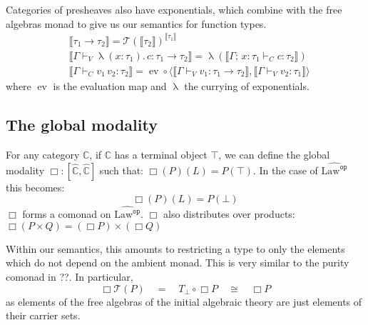 \documentclass[acmsmall, screen, nonacm]{acmart}
\theoremstyle{definition}
\newcommand{\glob}{\mathop{\Box}}
\newcommand{\cat}{\mathbb{C}}
\newcommand{\psh}{\widehat{\cat}}
\newcommand{\terminal}{\top}
\newcommand{\initial}{\bot}
\newcommand{\lawc}{\mathrm{Law}}
\newcommand{\lawcop}{\lawc^{\mathtt{op}}}
\newcommand{\pshlawcop}{\widehat{\lawcop}}
\newcommand{\arrow}[2]{{#2}^{#1}}
\newcommand{\sem}[1]{\llbracket #1 \rrbracket}
\newcommand{\mon}{\mathcal{T}}
\newcommand{\abs}[3]{\mathop{\lambda}(#1 \types #2).\,#3}
\newcommand{\app}[2]{#1\,#2}
\newcommand{\types}{\mathrel{:}}
\newcommand{\ccons}[2]{#1;\,#2}
\newcommand{\lbind}[3]{\ccons{#1}{#2\types#3}}
\newcommand{\turnv}{\mathrel{\vdash_V}}
\newcommand{\turnc}{\mathrel{\vdash_C}}
\newcommand{\evmap}{\mathop{ev}}
\newcommand{\currymap}{\mathop{\lambda}}
\begin{document}
Categories of presheaves also have exponentials, which combine with the
free algebras monad to give us our semantics for function types.
\begin{align*}
  &\sem{\tau_1 \rightarrow \tau_2} = \arrow{\sem{\tau_1}}{\mon(\sem{\tau_2})} \\
  &\sem{\Gamma \turnv \abs{x}{\tau_1}{c} \types \tau_1 \rightarrow \tau_2} =
    \currymap(\sem{\lbind{\Gamma}{x}{\tau_1} \turnc c \types \tau_2})
     \\
  &\sem{\Gamma \turnc \app{v_1}{v_2} \types \tau_2} =
    \evmap
    \circ \langle \sem{\Gamma \turnv v_1 \types \tau_1 \rightarrow \tau_2},
                  \sem{\Gamma \turnv v_2 \types \tau_1} \rangle
\end{align*}
where $\evmap$ is the evaluation map and $\currymap$ the currying of
exponentials.

\subsection{The global modality}

For any category $\cat$, if $\cat$ has a terminal object $\terminal$, we
can define the global modality $\glob \types [\psh, \psh]$ such that:
$\glob(P)(L) = P(\terminal)$. In the case of $\pshlawcop$ this becomes:
\begin{equation*}
\glob(P)(L) = P(\initial)
\end{equation*}
$\glob$ forms a comonad on $\pshlawcop$. $\glob$ also distributes over
products: $\glob (P \times Q) = (\glob P) \times (\glob Q)$

Within our semantics, this amounts to restricting a type to only the
elements which do not depend on the ambient monad. This is very similar
to the purity comonad in ??\cite{??}. In particular,
\begin{equation*}
  \glob \mon(P) \quad = \quad T_{\initial} \circ \glob P
  \quad \cong \quad \glob P
\end{equation*}
as elements of the free algebras of the initial algebraic theory are
just elements of their carrier sets.
\end{document}
